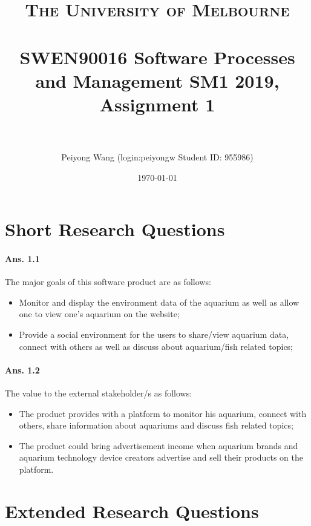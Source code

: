 \documentclass[paper=a4, fontsize=11pt]{scrartcl} %
\title{	
\normalfont \normalsize 
\textsc{The University of Melbourne } \\ [25pt] %
\horrule{0.5pt} \\[0.4cm] %
\huge SWEN90016 Software Processes and Management SM1 2019,
Assignment 1 \\ %
\horrule{2pt} \\[0.5cm] %
}
\author{Peiyong Wang   (login:peiyongw \; Student ID: 955986)} %
\date{\normalsize\today} %
\numberwithin{equation}{section} %
\numberwithin{figure}{section} %
\numberwithin{table}{section} %
\begin{document}
\maketitle %


\section{Short Research Questions}

\paragraph{Ans. 1.1}

The major goals of this software product are as follows:

\begin{itemize}
	\item Monitor and display the environment data of the aquarium as well as allow one to view one's aquarium on the website;
	\item Provide a social environment for the users to share/view aquarium data, connect with others as well as discuss about aquarium/fish related topics;
\end{itemize}

\paragraph{Ans. 1.2}
The value to the external stakeholder/s as follows:
\begin{itemize}
	\item The product provides with a platform to monitor his aquarium, connect with others, share information about aquariums and discuss fish related topics;
	\item The product could bring advertisement income when aquarium brands and aquarium technology device creators advertise and sell their products on the platform. 
\end{itemize}




\section{Extended Research Questions}
\end{document}
